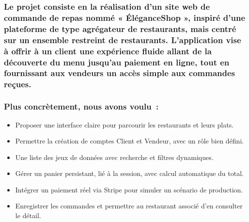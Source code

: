 \documentclass[
]{article}
\begin{document}
\subsubsection{}\label{section-1}

\subsubsection{\texorpdfstring{Le projet consiste en la réalisation d'un
site web de commande de repas nommé « ÉléganceShop », inspiré d'une
plateforme de type agrégateur de restaurants, mais centré sur un
ensemble restreint de restaurants. L'application vise à offrir à un
client une expérience fluide allant de la découverte du menu jusqu'au
paiement en ligne, tout en fournissant aux vendeurs un accès simple aux
commandes reçues.\\
}{Le projet consiste en la réalisation d'un site web de commande de repas nommé « ÉléganceShop », inspiré d'une plateforme de type agrégateur de restaurants, mais centré sur un ensemble restreint de restaurants. L'application vise à offrir à un client une expérience fluide allant de la découverte du menu jusqu'au paiement en ligne, tout en fournissant aux vendeurs un accès simple aux commandes reçues. }}\label{le-projet-consiste-en-la-ruxe9alisation-dun-site-web-de-commande-de-repas-nommuxe9-uxe9luxe9ganceshop-inspiruxe9-dune-plateforme-de-type-agruxe9gateur-de-restaurants-mais-centruxe9-sur-un-ensemble-restreint-de-restaurants.-lapplication-vise-uxe0-offrir-uxe0-un-client-une-expuxe9rience-fluide-allant-de-la-duxe9couverte-du-menu-jusquau-paiement-en-ligne-tout-en-fournissant-aux-vendeurs-un-accuxe8s-simple-aux-commandes-reuxe7ues.}

\subsubsection{Plus concrètement, nous avons
voulu~:}\label{plus-concruxe8tement-nous-avons-voulu}

\begin{itemize}
\item
  Proposer une interface claire pour parcourir les restaurants et leurs
  plats.
\item
  Permettre la création de comptes Client et Vendeur, avec un rôle bien
  défini.
\item
  Une liste des jeux de données avec recherche et filtres dynamiques.
\item
  Gérer un panier persistant, lié à la session, avec calcul automatique
  du total.
\item
  Intégrer un paiement réel via Stripe pour simuler un scénario de
  production.
\item
  Enregistrer les commandes et permettre au restaurant associé d'en
  consulter le détail.
\end{itemize}
\end{document}
